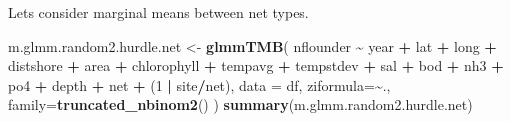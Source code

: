 \documentclass[
]{article}
\newenvironment{Shaded}{\begin{snugshade}}{\end{snugshade}}
\newcommand{\AttributeTok}[1]{\textcolor[rgb]{0.13,0.29,0.53}{#1}}
\newcommand{\DecValTok}[1]{\textcolor[rgb]{0.00,0.00,0.81}{#1}}
\newcommand{\FunctionTok}[1]{\textcolor[rgb]{0.13,0.29,0.53}{\textbf{#1}}}
\newcommand{\NormalTok}[1]{#1}
\newcommand{\OtherTok}[1]{\textcolor[rgb]{0.56,0.35,0.01}{#1}}
\newcommand{\SpecialCharTok}[1]{\textcolor[rgb]{0.81,0.36,0.00}{\textbf{#1}}}
\begin{document}
Lets consider marginal means between net types.

\begin{Shaded}
\begin{Highlighting}[]
\NormalTok{m.glmm.random2.hurdle.net }\OtherTok{\textless{}{-}} \FunctionTok{glmmTMB}\NormalTok{(}
\NormalTok{    nflounder }\SpecialCharTok{\textasciitilde{}}\NormalTok{ year }\SpecialCharTok{+}\NormalTok{ lat }\SpecialCharTok{+}\NormalTok{ long }\SpecialCharTok{+}\NormalTok{ distshore }\SpecialCharTok{+}\NormalTok{ area }\SpecialCharTok{+}\NormalTok{ chlorophyll }\SpecialCharTok{+}\NormalTok{ tempavg }\SpecialCharTok{+}\NormalTok{ tempstdev }\SpecialCharTok{+}\NormalTok{ sal }\SpecialCharTok{+}\NormalTok{ bod }\SpecialCharTok{+}\NormalTok{ nh3 }\SpecialCharTok{+}\NormalTok{ po4 }\SpecialCharTok{+}\NormalTok{ depth }\SpecialCharTok{+}\NormalTok{ net }\SpecialCharTok{+}\NormalTok{ (}\DecValTok{1} \SpecialCharTok{|}\NormalTok{ site}\SpecialCharTok{/}\NormalTok{net), }
    \AttributeTok{data =}\NormalTok{ df, }
    \AttributeTok{ziformula=}\SpecialCharTok{\textasciitilde{}}\NormalTok{.,}
    \AttributeTok{family=}\FunctionTok{truncated\_nbinom2}\NormalTok{()}
\NormalTok{)}
\FunctionTok{summary}\NormalTok{(m.glmm.random2.hurdle.net)}
\end{Highlighting}
\end{Shaded}
\end{document}
